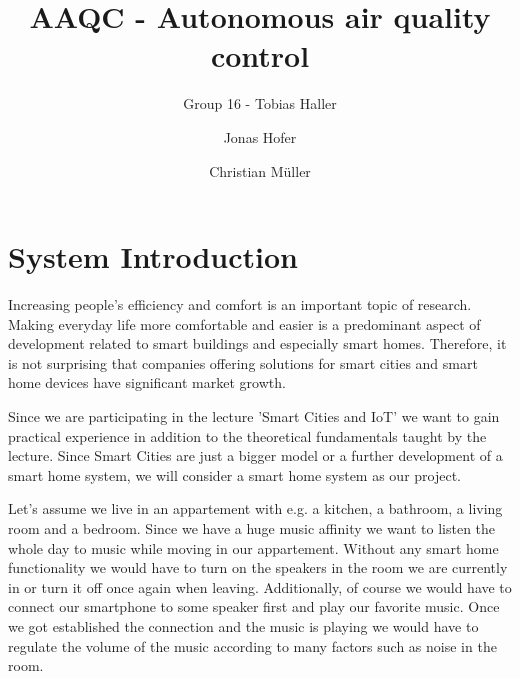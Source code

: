 \documentclass[runningheads]{llncs}
\begin{document}
%
    \title{AAQC - Autonomous air quality control}


    \author{Group 16 - Tobias Haller \and Jonas Hofer \and Christian M\"uller}


%
    \maketitle              %
%
%    


    \section{System Introduction}

    Increasing people's efficiency and comfort is an important topic of research.
    Making everyday life more comfortable and easier is a predominant aspect of development related to smart buildings and especially smart homes.
    Therefore, it is not surprising that companies offering solutions for smart cities and smart home devices have significant market growth.

    Since we are participating in the lecture 'Smart Cities and IoT' we want to gain practical experience in addition to the theoretical fundamentals taught by the lecture.
    Since Smart Cities are just a bigger model or a further development of a smart home system, we will consider a smart home system as our project.

    Let's assume we live in an appartement with e.g. a kitchen, a bathroom, a living room and a bedroom.
    Since we have a huge music affinity we want to listen the whole day to music while moving in our appartement.
    Without any smart home functionality we would have to turn on the speakers in the room we are currently in or turn it off once again when leaving.
    Additionally, of course we would have to connect our smartphone to some speaker first and play our favorite music.
    Once we got established the connection and the music is playing we would have to regulate the volume of the music according to many factors such as noise in the room.
\end{document}
